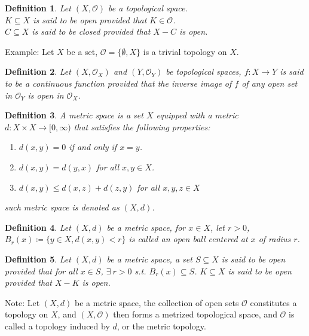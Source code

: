 \documentclass[11pt]{book}
\theoremstyle{break}
\theoremstyle{break}
\newtheorem{defn}{Definition}[corL]
\newcommand{\note}{\color{red}Note: \color{black}}
\newcommand{\example}{\color{green}Example: \color{black}}
\begin{document}
\begin{defn}
Let $(X,\mathcal{O})$ be a topological space. \\$K\subseteq X$ is said to be open provided that $K \in \mathcal{O}$. \\$C \subseteq X$ is said to be closed provided that $X - C$ is open. 
\end{defn}


\example Let $X$ be a set, $\mathcal{O} = \{ \emptyset, X\}$ is a trivial topology on $X$. 


\begin{defn}
Let $(X,\mathcal{O}_X)$ and $(Y,\mathcal{O}_Y)$ be topological spaces, $f:X \to Y$ is said to be a continuous function provided that the inverse image of $f$ of any open set in $\mathcal{O}_Y$ is open in $\mathcal{O}_X$.
\end{defn}

\begin{defn}
A metric space is a set $X$ equipped with a metric $d:X \times X \to [0,\infty)$ that satisfies the following properties:
\begin{enumerate}[topsep=3pt,itemsep=-1ex,partopsep=1ex,parsep=1ex]
\item $d(x,y) = 0$ if and only if $x=y$.
\item $d(x,y) = d(y,x)$ for all $x,y \in X$.
\item $d(x,y) \leq d(x,z) + d(z,y)$ for all $x,y,z \in X$
\end{enumerate}
such metric space is denoted as $(X,d)$.
\end{defn}

\begin{defn}
Let $(X,d)$ be a metric space, for $x\in X$, let $r>0$, $B_r(x) \coloneqq \{ y \in X, d(x,y) < r\}$ is called an open ball centered at $x$ of radius $r$. 
\end{defn}

\begin{defn}
Let $(X,d)$ be a metric space, a set $S\subseteq X$ is said to be open provided that for all $x \in S$, $\exists\ r >0$ s.t. $B_r(x) \subseteq S$. $K \subseteq X$ is said to be open provided that $X - K$ is open.
\end{defn}

\note Let $(X,d)$ be a metric space, the collection of open sets $\mathcal{O}$ constitutes a topology on $X$, and $(X,\mathcal{O})$ then forms a metrized topological space, and $\mathcal{O}$ is called a topology induced by $d$, or the metric topology. \\
\end{document}
